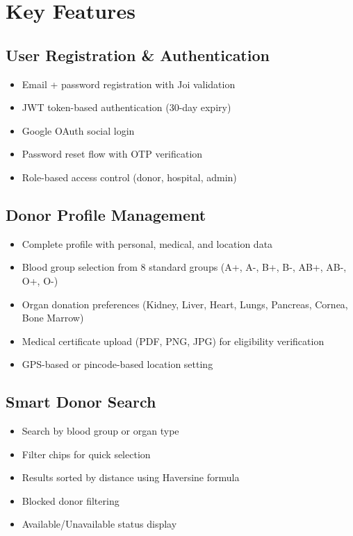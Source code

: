 \documentclass[12pt,a4paper]{article}
\begin{document}
\section{Key Features}

\subsection{User Registration \& Authentication}

\begin{itemize}[leftmargin=*]
    \item Email + password registration with Joi validation
    \item JWT token-based authentication (30-day expiry)
    \item Google OAuth social login
    \item Password reset flow with OTP verification
    \item Role-based access control (donor, hospital, admin)
\end{itemize}

\subsection{Donor Profile Management}

\begin{itemize}[leftmargin=*]
    \item Complete profile with personal, medical, and location data
    \item Blood group selection from 8 standard groups (A+, A-, B+, B-, AB+, AB-, O+, O-)
    \item Organ donation preferences (Kidney, Liver, Heart, Lungs, Pancreas, Cornea, Bone Marrow)
    \item Medical certificate upload (PDF, PNG, JPG) for eligibility verification
    \item GPS-based or pincode-based location setting
\end{itemize}

\subsection{Smart Donor Search}

\begin{itemize}[leftmargin=*]
    \item Search by blood group or organ type
    \item Filter chips for quick selection
    \item Results sorted by distance using Haversine formula
    \item Blocked donor filtering
    \item Available/Unavailable status display
\end{itemize}
\end{document}
